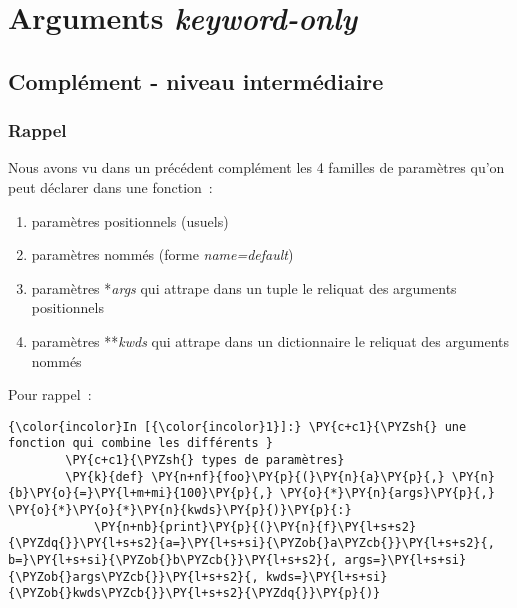     \hypertarget{arguments-keyword-only}{%
\section{\texorpdfstring{Arguments
\emph{keyword-only}}{Arguments keyword-only}}\label{arguments-keyword-only}}

    \hypertarget{compluxe9ment---niveau-intermuxe9diaire}{%
\subsection{Complément - niveau
intermédiaire}\label{compluxe9ment---niveau-intermuxe9diaire}}

    \hypertarget{rappel}{%
\subsubsection{Rappel}\label{rappel}}

    Nous avons vu dans un précédent complément les 4 familles de paramètres
qu'on peut déclarer dans une fonction~:

\begin{enumerate}
\def\labelenumi{\arabic{enumi}.}
\tightlist
\item
  paramètres positionnels (usuels)
\item
  paramètres nommés (forme \emph{name=default})
\item
  paramètres *\emph{args} qui attrape dans un tuple le reliquat des arguments
  positionnels
\item
  paramètres **\emph{kwds} qui attrape dans un dictionnaire le reliquat
  des arguments nommés
\end{enumerate}

Pour rappel~:

    \begin{Verbatim}[commandchars=\\\{\}]
{\color{incolor}In [{\color{incolor}1}]:} \PY{c+c1}{\PYZsh{} une fonction qui combine les différents }
        \PY{c+c1}{\PYZsh{} types de paramètres}
        \PY{k}{def} \PY{n+nf}{foo}\PY{p}{(}\PY{n}{a}\PY{p}{,} \PY{n}{b}\PY{o}{=}\PY{l+m+mi}{100}\PY{p}{,} \PY{o}{*}\PY{n}{args}\PY{p}{,} \PY{o}{*}\PY{o}{*}\PY{n}{kwds}\PY{p}{)}\PY{p}{:}
            \PY{n+nb}{print}\PY{p}{(}\PY{n}{f}\PY{l+s+s2}{\PYZdq{}}\PY{l+s+s2}{a=}\PY{l+s+si}{\PYZob{}a\PYZcb{}}\PY{l+s+s2}{, b=}\PY{l+s+si}{\PYZob{}b\PYZcb{}}\PY{l+s+s2}{, args=}\PY{l+s+si}{\PYZob{}args\PYZcb{}}\PY{l+s+s2}{, kwds=}\PY{l+s+si}{\PYZob{}kwds\PYZcb{}}\PY{l+s+s2}{\PYZdq{}}\PY{p}{)}
\end{Verbatim}


